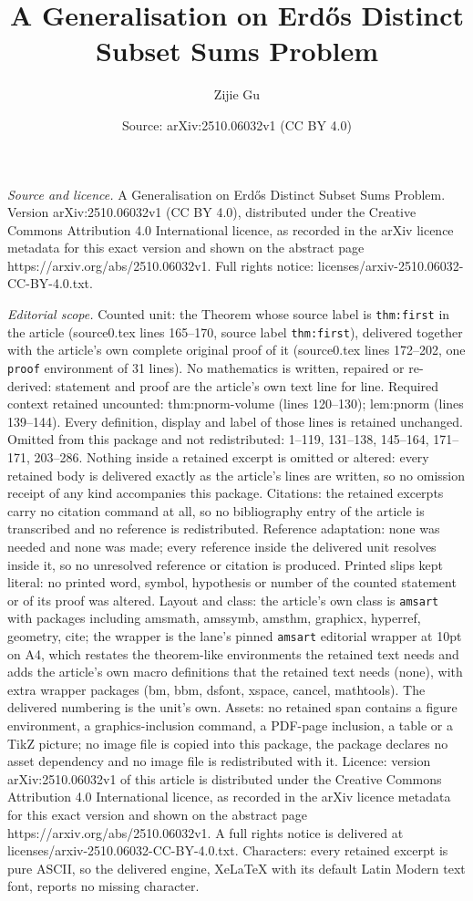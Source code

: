 \documentclass[10pt,a4paper]{amsart}
\title[A Generalisation on Erd\H{o}s Distinct Subset Sums Problem]{A Generalisation on Erd\H{o}s Distinct Subset Sums Problem}
\author{Zijie Gu}
\date{Source: arXiv:2510.06032v1 (CC BY 4.0)}
\begin{document}
\maketitle

\noindent\emph{Source and licence.} A Generalisation on Erd\H{o}s Distinct Subset Sums Problem. Version arXiv:2510.06032v1 (CC BY 4.0), distributed under the Creative Commons Attribution 4.0 International licence, as recorded in the arXiv licence metadata for this exact version and shown on the abstract page https://arxiv.org/abs/2510.06032v1. Full rights notice: licenses/arxiv-2510.06032-CC-BY-4.0.txt.\par\smallskip

\noindent\textit{Editorial scope.} Counted unit: the Theorem whose source label is \texttt{thm:first} in the article (source0.tex lines 165--170, source label \texttt{thm:first}), delivered together with the article's own complete original proof of it (source0.tex lines 172--202, one \texttt{proof} environment of 31 lines). No mathematics is written, repaired or re-derived: statement and proof are the article's own text line for line. Required context retained uncounted: thm:pnorm-volume (lines 120--130); lem:pnorm (lines 139--144). Every definition, display and label of those lines is retained unchanged. Omitted from this package and not redistributed: 1--119, 131--138, 145--164, 171--171, 203--286. Nothing inside a retained excerpt is omitted or altered: every retained body is delivered exactly as the article's lines are written, so no omission receipt of any kind accompanies this package. Citations: the retained excerpts carry no citation command at all, so no bibliography entry of the article is transcribed and no reference is redistributed. Reference adaptation: none was needed and none was made; every reference inside the delivered unit resolves inside it, so no unresolved reference or citation is produced. Printed slips kept literal: no printed word, symbol, hypothesis or number of the counted statement or of its proof was altered. Layout and class: the article's own class is \texttt{amsart} with packages including amsmath, amssymb, amsthm, graphicx, hyperref, geometry, cite; the wrapper is the lane's pinned \texttt{amsart} editorial wrapper at 10pt on A4, which restates the theorem-like environments the retained text needs and adds the article's own macro definitions that the retained text needs (none), with extra wrapper packages (bm, bbm, dsfont, xspace, cancel, mathtools). The delivered numbering is the unit's own. Assets: no retained span contains a figure environment, a graphics-inclusion command, a PDF-page inclusion, a table or a TikZ picture; no image file is copied into this package, the package declares no asset dependency and no image file is redistributed with it. Licence: version arXiv:2510.06032v1 of this article is distributed under the Creative Commons Attribution 4.0 International licence, as recorded in the arXiv licence metadata for this exact version and shown on the abstract page https://arxiv.org/abs/2510.06032v1. A full rights notice is delivered at licenses/arxiv-2510.06032-CC-BY-4.0.txt. Characters: every retained excerpt is pure ASCII, so the delivered engine, XeLaTeX with its default Latin Modern text font, reports no missing character.
\end{document}
